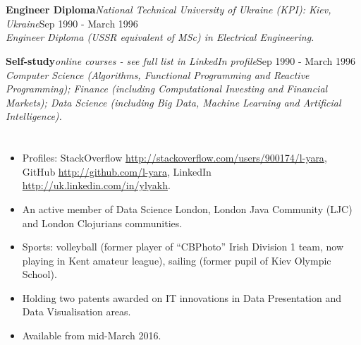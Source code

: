\documentclass{res}
\newcommand{\jobdes}[4]{\needspace{3\baselineskip} %
{\noindent \bf #3\hspace{2ex}}{{\em \small #1}}{\hfill #2}\\{{\it \small #4.}}}
\newcommand{\osection}[1]{\section{\sc {\Large \textbf{#1}\\}} \vspace{0.30cm}}
\begin{document}
\begin{resume}
\osection{EDUCATION}
\jobdes {National Technical University of Ukraine (KPI): Kiev, Ukraine}{Sep 1990 - March 1996}{Engineer Diploma}
 {Engineer Diploma (USSR equivalent of MSc) in Electrical Engineering}

\jobdes {online courses - see full list in LinkedIn profile}{Sep 1990 - March 1996}{Self-study}
 {Computer Science (Algorithms, Functional Programming and Reactive Programming); Finance (including Computational Investing and Financial Markets); Data Science (including Big Data, Machine Learning and Artificial Intelligence)}

\osection{SPECIALS}
\vspace{0.20cm}
\begin{itemize}
 \item Profiles: StackOverflow \url{http://stackoverflow.com/users/900174/l-yara}, GitHub \url{http://github.com/l-yara}, LinkedIn \url{http://uk.linkedin.com/in/ylyakh}.
 \item An active member of Data Science London, London Java Community (LJC) and London Clojurians communities.
 \item Sports: volleyball (former player of ``CBPhoto'' Irish Division 1 team, now playing in Kent amateur league), sailing (former pupil of Kiev Olympic School).
\item Holding two patents awarded on IT innovations in Data Presentation and Data Visualisation areas.
\item Available from mid-March 2016.
\end{itemize}


\end{resume}
\end{document}
